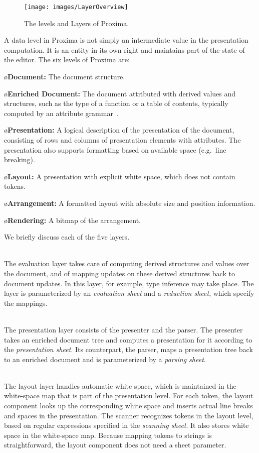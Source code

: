 \documentclass{article}[10pt]
\begin{document}
\begin{figure}[ht]
\centering
\texttt{[image: images/LayerOverview]}
\caption{The levels and Layers of Proxima.}
\label{fig:levelsAndLayers}
\end{figure}

A data level in Proxima is not simply an intermediate value in the presentation computation. It is an entity in its own right and maintains part of the state of the editor. The six levels of Proxima are:


\bl
\o {\bf Document:} The document structure.

\o {\bf Enriched Document:} The document attributed with derived values and structures, such as the type of a function or a table of contents, typically computed by an attribute grammar~\cite{reps84synGen}.

\o{\bf Presentation:} A logical description of the presentation of the document, consisting of rows and columns of presentation elements with attributes. The presentation also supports formatting based on available space (e.g.\ line breaking).

\o{\bf Layout:} A presentation with explicit white space, which does not contain tokens.

\o{\bf Arrangement:} A formatted layout with absolute size and position information.

\o{\bf Rendering:} A bitmap of the arrangement.
\el


\bc
We briefly discuss each of the five layers.

\\
The evaluation layer takes care of computing derived structures and values over the document, and of mapping updates on these derived structures back to document updates. In this layer, for example, type inference may take place. The layer is parameterized by an {\em evaluation sheet} and a {\em reduction sheet}, which specify the mappings. 

\\
The presentation layer consists of the presenter and the parser. The presenter takes an enriched document tree and computes a presentation for it according to the {\em presentation sheet}. Its counterpart, the parser, maps a presentation tree back to an enriched document and is parameterized by a {\em parsing sheet}.

\\
The layout layer handles automatic white space, which is maintained in the white-space map that is part of the presentation level. For each token, the layout component looks up the corresponding white space and inserts actual line breaks and spaces in the presentation. The scanner recognizes tokens in the layout level, based on regular expressions specified in the {\em scanning sheet}. It also stores white space in the white-space map. Because mapping tokens to strings is straightforward, the layout component does not need a sheet parameter.
\end{document}
